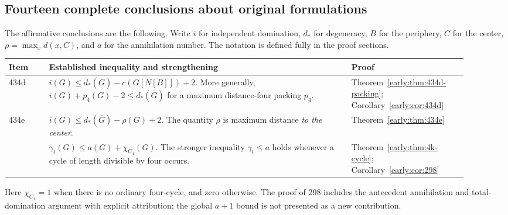 \documentclass[11pt,a4paper]{article}
\theoremstyle{definition}\newtheorem{definition}[theorem]{Definition}
\theoremstyle{remark}\newtheorem{remark}[theorem]{Remark}
\begin{document}
\subsection{Fourteen complete conclusions about original formulations}
The affirmative conclusions are the following. Write $i$ for independent
domination, $d_*$ for degeneracy, $B$ for the periphery, $C$ for the center,
$\rho=\max_x d(x,C)$, and $a$ for the annihilation number.
The notation is defined fully in the proof sections.
\begin{center}
\begin{tabular}{>{\raggedright\arraybackslash}p{0.08\linewidth}>{\raggedright\arraybackslash}p{0.60\linewidth}>{\raggedright\arraybackslash}p{0.23\linewidth}}
\toprule
Item&Established inequality and strengthening&Proof\\\midrule
434d&$i(G)\le d_*(\overline G)-c(G[N[B]])+2$.
More generally, $i(G)+p_4(G)-2\le d_*(\overline G)$ for a
maximum distance-four packing $p_4$.&
Theorem~\ref{early:thm:434d-packing};
Corollary~\ref{early:cor:434d}\\[5pt]
434e&$i(G)\le d_*(\overline G)-\rho(G)+2$.
The quantity $\rho$ is maximum distance \emph{to the center}.&
Theorem~\ref{early:thm:434e}\\[5pt]
298&$\gamma_t(G)\le a(G)+\chi_{C_4}(G)$.
The stronger inequality $\gamma_t\le a$ holds whenever a cycle
of length divisible by four occurs.&
Theorem~\ref{early:thm:4k-cycle};
Corollary~\ref{early:cor:298}\\\bottomrule
\end{tabular}
\end{center}
Here $\chi_{C_4}=1$ when there is no ordinary four-cycle, and zero
otherwise. The proof of 298 includes the antecedent annihilation
and total-domination argument with explicit attribution; the global
$a+1$ bound is not presented as a new contribution.
\end{document}
